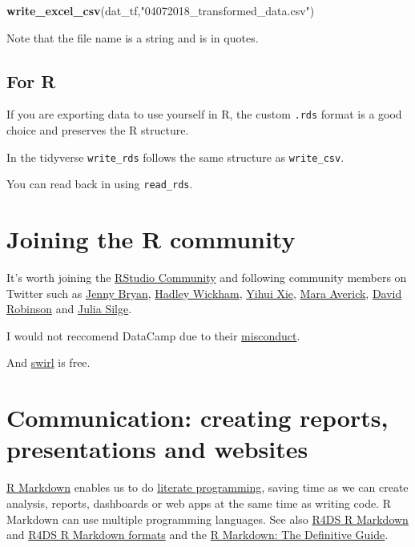 \documentclass[12pt,]{book}
\newenvironment{Shaded}{\begin{snugshade}}{\end{snugshade}}
\newcommand{\KeywordTok}[1]{\textcolor[rgb]{0.13,0.29,0.53}{\textbf{#1}}}
\newcommand{\NormalTok}[1]{#1}
\newcommand{\StringTok}[1]{\textcolor[rgb]{0.31,0.60,0.02}{#1}}
\begin{document}
\begin{Shaded}
\begin{Highlighting}[]
\KeywordTok{write_excel_csv}\NormalTok{(dat_tf,}\StringTok{"04072018_transformed_data.csv"}\NormalTok{)}
\end{Highlighting}
\end{Shaded}

Note that the file name is a string and is in quotes.

\hypertarget{for-r}{%
\subsection{For R}\label{for-r}}

If you are exporting data to use yourself in R, the custom \texttt{.rds} format is a
good choice and preserves the R structure.

In the tidyverse \texttt{write\_rds} follows the same structure as \texttt{write\_csv}.

You can read back in using \texttt{read\_rds}.

\hypertarget{joining-the-r-community}{%
\section{Joining the R community}\label{joining-the-r-community}}

It's worth joining the \href{https://community.rstudio.com/}{RStudio Community} and
following community members on Twitter such as \href{https://twitter.com/JennyBryan}{Jenny Bryan}, \href{https://twitter.com/hadleywickham}{Hadley Wickham}, \href{https://twitter.com/xieyihui}{Yihui Xie}, \href{https://twitter.com/dataandme}{Mara Averick},
\href{https://twitter.com/drob}{David Robinson}
and \href{https://twitter.com/juliasilge}{Julia Silge}.

I would not reccomend DataCamp due to their \href{https://juliasilge.com/blog/datacamp-misconduct/}{misconduct}.

And \href{https://swirlstats.com/}{swirl} is free.

\hypertarget{communication-creating-reports-presentations-and-websites}{%
\section{Communication: creating reports, presentations and websites}\label{communication-creating-reports-presentations-and-websites}}

\href{https://rmarkdown.rstudio.com/lesson-1.html}{R Markdown} \citep{R-rmarkdown} enables us to do
\href{https://en.wikipedia.org/wiki/Literate_programming}{literate programming}, saving time as we can create analysis, reports, dashboards or web apps at the same time
as writing code. R Markdown can use multiple programming languages.
See also \href{http://r4ds.had.co.nz/r-markdown.html}{R4DS R Markdown} and
\href{http://r4ds.had.co.nz/r-markdown-formats.html}{R4DS R Markdown formats} and
the \href{https://bookdown.org/yihui/rmarkdown/}{R Markdown: The Definitive Guide}.
\end{document}
